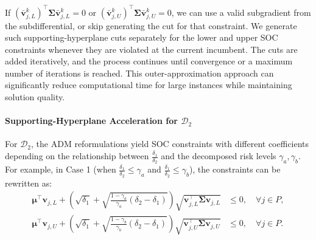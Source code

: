 \documentclass[preprint,12pt,authoryear]{elsarticle}
\begin{document}
If $(\bar{\mathbf{v}}_{j,L}^k)^{\top} \boldsymbol{\Sigma} \bar{\mathbf{v}}_{j,L}^k = 0$ or $(\bar{\mathbf{v}}_{j,U}^k)^{\top} \boldsymbol{\Sigma} \bar{\mathbf{v}}_{j,U}^k = 0$, we can use a valid subgradient from the subdifferential, or skip generating the cut for that constraint. We generate such supporting-hyperplane cuts separately for the lower and upper SOC constraints whenever they are violated at the current incumbent. The cuts are added iteratively, and the process continues until convergence or a maximum number of iterations is reached. This outer-approximation approach can significantly reduce computational time for large instances while maintaining solution quality.

\paragraph{Supporting-Hyperplane Acceleration for $\mathcal{D}_2$}
For $\mathcal{D}_2$, the ADM reformulations yield SOC constraints with different coefficients depending on the relationship between $\frac{\delta_1}{\delta_2}$ and the decomposed risk levels $\gamma_a, \gamma_b$. For example, in Case 1 (when $\frac{\delta_1}{\delta_2} \leqslant \gamma_a$ and $\frac{\delta_1}{\delta_2} \leqslant \gamma_b$), the constraints can be rewritten as:
\begin{align}
\boldsymbol{\mu}^\top \mathbf{v}_{j,L} + \left(\sqrt{\delta_1} + \sqrt{\frac{1 - \gamma_a}{\gamma_a} (\delta_2 - \delta_1)}\right) \sqrt{\mathbf{v}_{j,L}^\top \boldsymbol{\Sigma} \mathbf{v}_{j,L}} &\leqslant 0, \quad \forall j \in P, \label{eq:rel_workload_d2_case1_lower_soc} \\
\boldsymbol{\mu}^\top \mathbf{v}_{j,U} + \left(\sqrt{\delta_1} + \sqrt{\frac{1 - \gamma_b}{\gamma_b} (\delta_2 - \delta_1)}\right) \sqrt{\mathbf{v}_{j,U}^\top \boldsymbol{\Sigma} \mathbf{v}_{j,U}} &\leqslant 0, \quad \forall j \in P. \label{eq:rel_workload_d2_case1_upper_soc}
\end{align}
\end{document}
